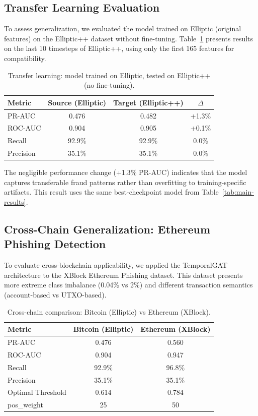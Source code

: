 \documentclass[12pt,a4paper]{article}
\begin{document}
\subsection{Transfer Learning Evaluation}
To assess generalization, we evaluated the model trained on Elliptic (original features) on the Elliptic++ dataset without fine-tuning. Table~\ref{tab:transfer} presents results on the last 10 timesteps of Elliptic++, using only the first 165 features for compatibility.

\begin{table}[H]
\centering
\caption{Transfer learning: model trained on Elliptic, tested on Elliptic++ (no fine-tuning).}
\label{tab:transfer}
\begin{tabular}{lccc}
\toprule
\textbf{Metric} & \textbf{Source (Elliptic)} & \textbf{Target (Elliptic++)} & \textbf{$\Delta$} \\
\midrule
PR-AUC & 0.476 & 0.482 & +1.3\% \\
ROC-AUC & 0.904 & 0.905 & +0.1\% \\
Recall & 92.9\% & 92.9\% & 0.0\% \\
Precision & 35.1\% & 35.1\% & 0.0\% \\
\bottomrule
\end{tabular}
\end{table}

The negligible performance change (+1.3\% PR-AUC) indicates that the model captures transferable fraud patterns rather than overfitting to training-specific artifacts. This result uses the same best-checkpoint model from Table~\ref{tab:main-results}.

\subsection{Cross-Chain Generalization: Ethereum Phishing Detection}
To evaluate cross-blockchain applicability, we applied the TemporalGAT architecture to the XBlock Ethereum Phishing dataset. This dataset presents more extreme class imbalance (0.04\% vs 2\%) and different transaction semantics (account-based vs UTXO-based).

\begin{table}[H]
\centering
\caption{Cross-chain comparison: Bitcoin (Elliptic) vs Ethereum (XBlock).}
\label{tab:ethereum-results}
\begin{tabular}{lcc}
\toprule
\textbf{Metric} & \textbf{Bitcoin (Elliptic)} & \textbf{Ethereum (XBlock)} \\
\midrule
PR-AUC & 0.476 & 0.560 \\
ROC-AUC & 0.904 & 0.947 \\
Recall & 92.9\% & 96.8\% \\
Precision & 35.1\% & 35.1\% \\
Optimal Threshold & 0.614 & 0.784 \\
pos\_weight & 25 & 50 \\
\bottomrule
\end{tabular}
\end{table}
\end{document}
